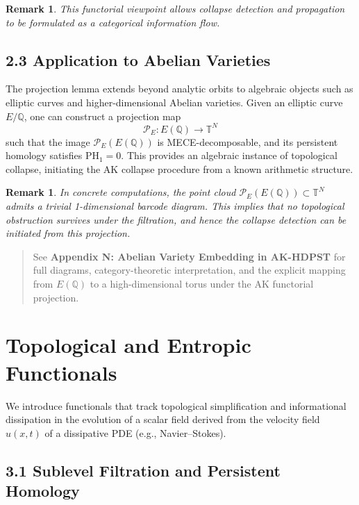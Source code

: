 \documentclass[11pt]{article}
\newcommand{\QQ}{\mathbb{Q}}
\newtheorem{remark}[theorem]{Remark}
\begin{document}
\begin{remark}
This functorial viewpoint allows collapse detection and propagation to be formulated as a categorical information flow.
\end{remark}

\subsection*{2.3 Application to Abelian Varieties}

The projection lemma extends beyond analytic orbits to algebraic objects such as elliptic curves and higher-dimensional Abelian varieties.  
Given an elliptic curve \( E/\QQ \), one can construct a projection map
\[
\mathcal{P}_E: E(\QQ) \longrightarrow \mathbb{T}^N
\]
such that the image \( \mathcal{P}_E(E(\QQ)) \) is MECE-decomposable, and its persistent homology satisfies \( \mathrm{PH}_1 = 0 \).  
This provides an algebraic instance of topological collapse, initiating the AK collapse procedure from a known arithmetic structure.

\begin{remark}
In concrete computations, the point cloud \( \mathcal{P}_E(E(\QQ)) \subset \mathbb{T}^N \) admits a trivial 1-dimensional barcode diagram.  
This implies that no topological obstruction survives under the filtration, and hence the collapse detection can be initiated from this projection.
\end{remark}

\begin{quote}
See \textbf{Appendix N: Abelian Variety Embedding in AK-HDPST} for full diagrams, category-theoretic interpretation,  
and the explicit mapping from \( E(\QQ) \) to a high-dimensional torus under the AK functorial projection.
\end{quote}





\section{Topological and Entropic Functionals}

We introduce functionals that track topological simplification and informational dissipation in the evolution of a scalar field derived from the velocity field $u(x,t)$ of a dissipative PDE (e.g., Navier--Stokes).

\subsection{3.1 Sublevel Filtration and Persistent Homology}
\end{document}
